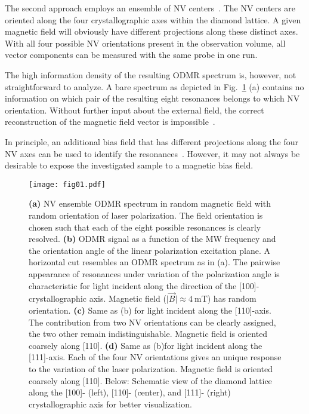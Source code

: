 \documentclass[
 reprint,
 amsmath,
 amssymb,
aps,
 prb,
showpacs
]{revtex4-1}
\begin{document}
The second approach employs an ensemble of NV centers~\cite{aplawschvec, APLinfrared, Glenn2015}. The NV centers are oriented along the four crystallographic axes within the diamond lattice. A given magnetic field will obviously have different projections along these distinct axes. With all four possible NV orientations present in the observation volume, all vector components can be measured with the same probe in one run. 

The high information density of the resulting ODMR spectrum is, however, not straightforward to analyze. A bare spectrum as depicted in Fig.~\ref{fig:01} (a)  contains no information on which pair of the resulting eight resonances belongs to which NV orientation. Without further input about the external field, the correct reconstruction of the magnetic field vector is impossible~\cite{revsciinstarray}.

In principle, an additional bias field that has different projections along the four NV axes can be used to identify the resonances~\cite{aplawschvec}. However, it may not always be desirable to expose the investigated sample to a magnetic bias field.

\begin{figure}\texttt{[image: fig01.pdf]}
	\caption{\textbf{(a)} NV ensemble ODMR spectrum in random magnetic field  with random orientation of laser polarization. The field orientation is chosen such that each of the eight possible resonances is clearly resolved. \textbf{(b)} ODMR signal as a function of the MW frequency and the orientation angle of the linear polarization excitation plane. A horizontal cut resembles an ODMR spectrum as in (a). The pairwise appearance of resonances under variation of the polarization angle is characteristic for light incident along the direction of the [100]-crystallographic axis. Magnetic field ($\vert \vec{B} \vert \approx \SI{4}{\milli\tesla}$) has random orientation. \textbf{(c)} Same as (b) for light incident along the [110]-axis. The contribution from two NV orientations can be clearly assigned, the two other remain indistinguishable. Magnetic field is oriented coarsely along [110]. \textbf{(d)} Same as (b)for light incident along the [111]-axis. Each of the four NV orientations gives an unique response to the variation of the laser polarization. Magnetic field is oriented coarsely along [110]. Below: Schematic view of the diamond lattice along the [100]- (left), [110]- (center), and [111]- (right) crystallographic axis for better visualization.}
	\label{fig:01}
\end{figure}
\end{document}
